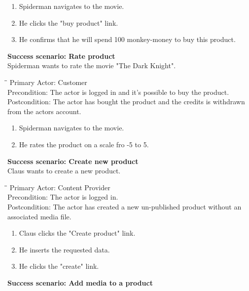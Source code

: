 \begin{enumerate} \setlength{\itemsep}{-1mm}
	\item Spiderman navigates to the movie.
	\item He clicks the "buy product" link.
	\item He confirms that he will spend 100 monkey-money to buy this product.
\end{enumerate}
\vspace{3mm}
\textbf{Success scenario: Rate product} \\
Spiderman wants to rate the movie "The Dark Knight". 
\begin{tabbing}
\hspace{5mm}\=\hspace{26mm}\=\kill
\>Primary Actor:\> Customer\\
\>Precondition:\> The actor is logged in and it's possible to buy the product.\\
\>Postcondition:\> The actor has bought the product and the credits is withdrawn from the actors account.
\end{tabbing}
\begin{enumerate} \setlength{\itemsep}{-1mm}
	\item Spiderman navigates to the movie.
	\item He rates the product on a scale fro -5 to 5.
\end{enumerate}
\vspace{3mm}
\textbf{Success scenario: Create new product} \\
Claus wants to create a new product. 
\begin{tabbing}
\hspace{5mm}\=\hspace{26mm}\=\kill
\>Primary Actor:\> Content Provider\\
\>Precondition:\> The actor is logged in.\\
\>Postcondition:\> The actor has created a new un-published product without an associated media file.
\end{tabbing}
\begin{enumerate} \setlength{\itemsep}{-1mm}
	\item Claus clicks the "Create product" link.
	\item He inserts the requested data.
	\item He clicks the "create" link.
\end{enumerate}
\vspace{3mm}
\textbf{Success scenario: Add media to a product} \\
